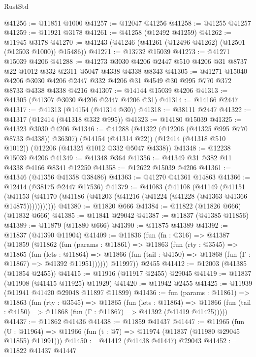 \begin{lexlean}{RustStd}
\begin{coremodule}
{\begin{coremodule}
{{{{{{{{{{{{{{{{{{{{{{{{{{{{{{{{{{{{{{{{{{{{{{{{{{@41256 := @11851 @1000
@41257 := @12047 @41256
@41258 := @41255 @41257
@41259 := @11921 @3178
@41261 := @41258 (@12492 @41259)
@41262 := @11945 @3178
@41270 := @41243 (@41246 (@41261 (@12496 @41262) (@12501 (@12503 @1000)) @15486))
@41271 := @13732 @15039
@41273 := @41271 @15039 @4206
@41288 := @41273 @3030 @4206 @2447 @510 @4206 @31 @8737 @22 @1012 @332 @2311 @5047 @4338 @4338 @8343
@41305 := @41271
    @15040
    @4206
    @3030
    @4206
    @2447
    @332
    @4206
    @31
    @4549
    @30
    @995
    @770
    @372
    @8733
    @4338
    @4338
    @4216
@41307 := @14144 @15039 @4206
@41313 := @41305 (@41307 @3030 @4206 @2447 @4206 @31)
@41314 := @14166 @2447
@41317 := @41313 (@14154 (@41314 @30))
@41318 := @38111 @2447
@41322 := @41317 (@12414 (@41318 @332 @995))
@41323 := @14180 @15039
@41325 := @41323 @3030 @4206
@41346 := @41288
    (@41322 (@12206 (@41325 @995 @770 @8733 @4338)) @36307)
    (@14154 (@41314 @22))
    (@12414 (@41318 @510 @1012))
    (@12206 (@41325 @1012 @332 @5047 @4338))
@41348 := @12238 @15039 @4206
@41349 := @41348 @364
@41356 := @41349 @31 @382 @11 @4338 @4166 @8341 @12250
@41358 := @12622 @15039 @4206
@41361 := @41346 (@41356 @41358 @38486)
@41363 := @41270 @41361 @14863
@41366 := @12414 (@38175 @2447 @17536)
@41379 := @41083
    (@41108
      (@41149
        (@41151
          (@41153 (@41170 (@41186 (@41203 (@41216 (@41224 (@41228 (@41363 @41366 @14875)))))))))))
@41380 := @11820 @666
@41384 := @11822 (@11826 @666) (@11832 @666)
@41385 := @11841 @29042
@41387 := @11837 (@41385 @11856)
@41389 := @11879 (@11880 @666)
@41390 := @11875 @41389
@41392 := @11837 (@41390 @11904)
@41409 := @11836
    (fun (fn : @316) =>
    @41387
      (@11859
        (@11862
          (fun (params : @11861) =>
          @11863
            (fun (rty : @3545) =>
            @11865
              (fun (lets : @11864) =>
              @11866 (fun (tail : @4150) => @11868 (fun (Γ : @11867) => @41392 @11951))))))
        @11997))
    @2455
@41412 := @12003 (@41385 (@11854 @2455))
@41415 := @11916 (@11917 @2455) @29045
@41419 := @11837 (@11908 (@41415 @11925) @11929)
@41420 := @11942 @2455
@41425 := @11939 (@11941 @41420 @29048 @11897 @11899)
@41436 := fun (params : @11861) =>
  @11863
    (fun (rty : @3545) =>
    @11865
      (fun (lets : @11864) =>
      @11866 (fun (tail : @4150) => @11868 (fun (Γ : @11867) => @41392 (@41419 @41425)))))
@41437 := @11862 @41436
@41438 := @11859 @41437
@41447 := @11965
    (fun (U : @11964) => @11966 (fun (t : @7) => @11974 (@11837 (@11980 @29045 @11855) @11991)))
@41450 := @41412 (@41438 @41447) @29043
@41452 := @11822 @41437 @41447
}}}}}}}}}}}}}}}}}}}}}}}}}}}}}}}}}}}}}}}}}}}}}}}}}}
\end{coremodule}}
\end{coremodule}
\end{lexlean}
